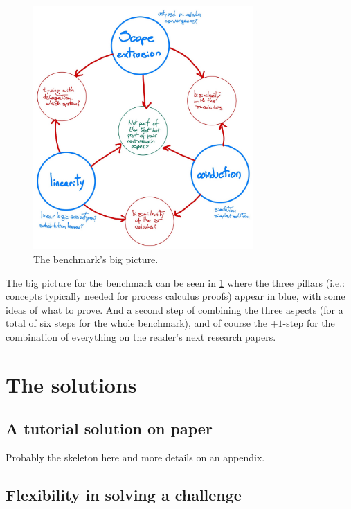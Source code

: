 \documentclass{article}
\begin{document}
\begin{figure}[h]
  \centering
  \includegraphics[width=0.75\textwidth]{../images/benchmark.jpeg}
  \caption{The benchmark's big picture.}
  \label{fig:bigpic}
\end{figure}

The big picture for the benchmark can be seen in \cref{fig:bigpic}
where the three pillars (i.e.: concepts typically needed for process
calculus proofs) appear in blue, with some ideas of what to prove. And
a second step of combining the three aspects (for a total of six steps
for the whole benchmark), and of course the $+1$-step for the
combination of everything on the reader's next research papers.



\section{The solutions}\label{sec:solutions}

\subsection{A tutorial solution on paper}\label{sec:tutorial}

Probably the skeleton here and more details on an appendix.

\subsection{Flexibility in solving a challenge}
\end{document}
